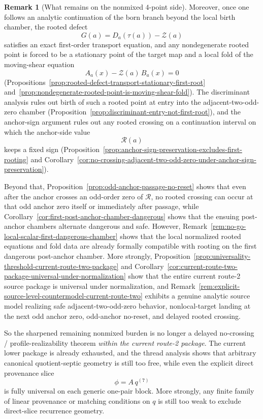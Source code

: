 \documentclass[11pt,a4paper]{amsart}
\theoremstyle{plain}
\theoremstyle{definition}
\newtheorem{remark}[theorem]{Remark}
\begin{document}
\begin{remark}[What remains on the nonmixed $4$-point side]
Moreover, once one follows an analytic continuation of the born branch beyond
the local birth chamber, the rooted defect
\[
G(a)=D_a(\tau(a))-\mathcal Z(a)
\]
satisfies an exact first-order transport equation, and any nondegenerate rooted
point is forced to be a stationary point of the target map and a local fold of
the moving-shear equation
\[
A_a(x)-\mathcal Z(a)\,B_a(x)=0
\]
(Propositions~\ref{prop:rooted-defect-transport-stationary-first-root}
and~\ref{prop:nondegenerate-rooted-point-is-moving-shear-fold}).
The discriminant analysis rules out birth of such a rooted point at entry into
the adjacent-two-odd-zero chamber
(Proposition~\ref{prop:discriminant-entry-not-first-root}),
and the anchor-sign argument rules out any rooted crossing on a continuation
interval on which the anchor-side value
\[
\mathcal R(a)
\]
keeps a fixed sign
(Proposition~\ref{prop:anchor-sign-preservation-excludes-first-rooting} and
Corollary~\ref{cor:no-crossing-adjacent-two-odd-zero-under-anchor-sign-preservation}).

Beyond that, Proposition~\ref{prop:odd-anchor-passage-no-reset} shows that even
after the anchor crosses an odd-order zero of $\mathcal R$, no rooted crossing
can occur at that odd anchor zero itself or immediately after passage, while
Corollary~\ref{cor:first-post-anchor-chamber-dangerous} shows that the ensuing
post-anchor chambers alternate dangerous and safe. However,
Remark~\ref{rem:no-go-local-scalar-first-dangerous-chamber} shows that the local
normalized rooted equations and fold data are already formally compatible with
rooting on the first dangerous post-anchor chamber. More strongly,
Proposition~\ref{prop:universality-threshold-current-route-two-package} and
Corollary~\ref{cor:current-route-two-package-universal-under-normalization}
show that the entire current route-2 source package is universal under
normalization, and
Remark~\ref{rem:explicit-source-level-countermodel-current-route-two}
exhibits a genuine analytic source model realizing safe adjacent-two-odd-zero
behavior, nonlocal-target landing at the next odd anchor zero, odd-anchor
no-reset, and delayed rooted crossing.

So the sharpened remaining nonmixed burden is no longer a delayed no-crossing /
profile-realizability theorem \emph{within the current route-2 package}. The
current lower package is already exhausted, and the thread analysis shows that
arbitrary canonical quotient-septic geometry is still too free, while even the
explicit direct provenance slice
\[
\phi=A\,q^{(7)}
\]
is fully universal on each generic one-pair block. More strongly, any finite
family of linear provenance or matching conditions on $q$ is still too weak to
exclude direct-slice recurrence geometry.


\end{remark}
\end{document}
